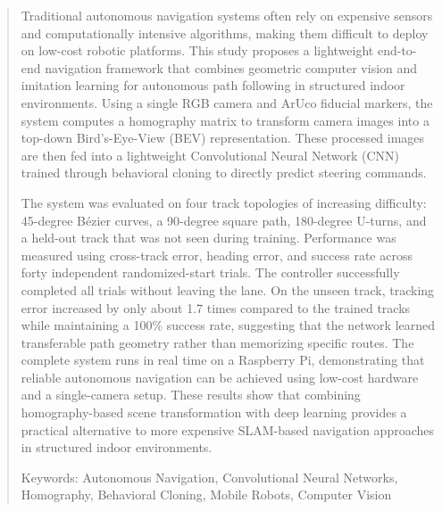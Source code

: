 
\begin{abstract}
Traditional autonomous navigation systems often rely on expensive sensors and computationally intensive algorithms, making them difficult to deploy on low-cost robotic platforms. This study proposes a lightweight end-to-end navigation framework that combines geometric computer vision and imitation learning for autonomous path following in structured indoor environments. Using a single RGB camera and ArUco fiducial markers, the system computes a homography matrix to transform camera images into a top-down Bird's-Eye-View (BEV) representation. These processed images are then fed into a lightweight Convolutional Neural Network (CNN) trained through behavioral cloning to directly predict steering commands.

The system was evaluated on four track topologies of increasing difficulty: 45-degree Bézier curves, a 90-degree square path, 180-degree U-turns, and a held-out track that was not seen during training. Performance was measured using cross-track error, heading error, and success rate across forty independent randomized-start trials. The controller successfully completed all trials without leaving the lane. On the unseen track, tracking error increased by only about 1.7 times compared to the trained tracks while maintaining a 100\% success rate, suggesting that the network learned transferable path geometry rather than memorizing specific routes. The complete system runs in real time on a Raspberry Pi, demonstrating that reliable autonomous navigation can be achieved using low-cost hardware and a single-camera setup. These results show that combining homography-based scene transformation with deep learning provides a practical alternative to more expensive SLAM-based navigation approaches in structured indoor environments.

Keywords: Autonomous Navigation, Convolutional Neural Networks, Homography, Behavioral Cloning, Mobile Robots, Computer Vision

\end{abstract}